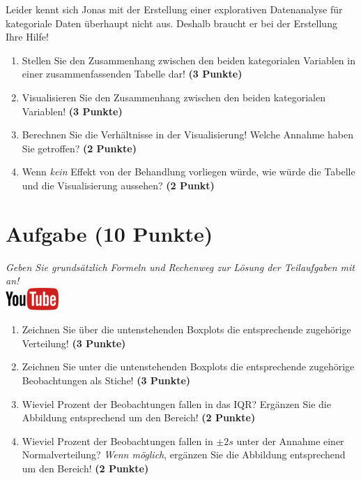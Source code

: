 \documentclass[a4paper, 9pt]{scrartcl}\usepackage[]{graphicx}\usepackage[]{xcolor}
\begin{document}
\vspace{2Ex}

Leider kennt sich Jonas mit der Erstellung einer explorativen Datenanalyse für kategoriale Daten überhaupt nicht aus. Deshalb braucht er bei der Erstellung Ihre Hilfe!

\begin{enumerate}
\item Stellen Sie den Zusammenhang zwischen den beiden kategorialen Variablen in einer zusammenfassenden Tabelle dar! \textbf{(3 Punkte)}
\item Visualisieren Sie den Zusammenhang zwischen den beiden kategorialen Variablen! \textbf{(3 Punkte)}
\item Berechnen Sie die Verhältnisse in der Visualisierung! Welche Annahme haben Sie getroffen? \textbf{(2 Punkte)}
\item Wenn \textit{kein} Effekt von der Behandlung vorliegen würde, wie würde die Tabelle und die Visualisierung aussehen? \textbf{(2 Punkt)}
\end{enumerate} 
\clearpage

\section{Aufgabe \hfill (10 Punkte)}

\textit{Geben Sie grunds{\"a}tzlich Formeln und Rechenweg zur L{\"o}sung der
  Teilaufgaben mit an!} \\[1Ex]

\hfill\href{https://youtu.be/Op-gjzASH9I}{\includegraphics[width =
  2cm]{img/youtube}}\\[1Ex]



\begin{enumerate}
\item Zeichnen Sie {\"u}ber die untenstehenden Boxplots die entsprechende
  zugeh{\"o}rige Verteilung! \textbf{(3 Punkte)} 
\item Zeichnen Sie unter die untenstehenden Boxplots die entsprechende
  zugeh{\"o}rige Beobachtungen als Stiche! \textbf{(3 Punkte)}
\item Wieviel Prozent der Beobachtungen fallen in das IQR? Erg{\"a}nzen Sie die
  Abbildung entsprechend um den Bereich! \textbf{(2 Punkte)}
\item Wieviel Prozent der Beobachtungen fallen in $\pm 2s$ unter
  der Annahme einer Normalverteilung?  \textit{Wenn m{\"o}glich}, erg{\"a}nzen Sie
  die Abbildung entsprechend um den Bereich! \textbf{(2 Punkte)}
\end{enumerate}
\end{document}
